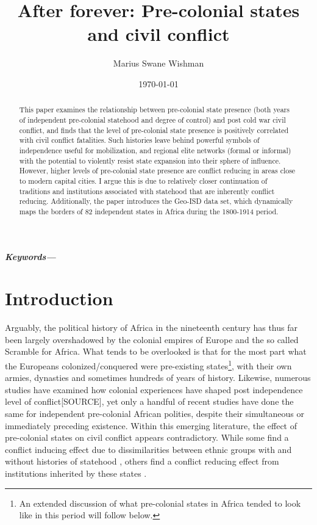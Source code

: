 \documentclass[12pt]{article}
\title{After forever: Pre-colonial states and civil conflict}
\author[1]{Marius Swane Wishman}
\affil[1]{Department of Sociology and Political Science, NTNU}
\date{\today}
\providecommand{\keywords}[1]
{
	\small	
	\textbf{\textit{Keywords---}} #1
}
\begin{document}
\maketitle

\begin{abstract}

This paper examines the relationship between pre-colonial state presence (both
years of independent pre-colonial statehood and degree of control) and post cold
war civil conflict, and finds that the level of pre-colonial state presence is
positively correlated with civil conflict fatalities. Such histories leave
behind powerful symbols of independence useful for mobilization, and regional
elite networks (formal or informal) with the potential to violently resist state
expansion into their sphere of influence. However, higher levels of pre-colonial
state presence are conflict reducing in areas close to modern capital cities. I
argue this is due to relatively closer continuation of traditions and
institutions associated with statehood that are inherently conflict reducing.
Additionally, the paper introduces the Geo-ISD data set, which dynamically maps
the borders of 82 independent states in Africa during the 1800-1914 period. 

\end{abstract}

\keywords{}


\onehalfspacing


\newpage

\section{Introduction}

Arguably, the political history of Africa in the nineteenth century has thus far
been largely overshadowed by the colonial empires of Europe and the so called
Scramble for Africa. What tends to be overlooked is that for the most part what
the Europeans colonized/conquered were pre-existing states\footnote{An extended
discussion of what pre-colonial states in Africa tended to look like in this
period will follow below.}, with their own armies, dynasties and sometimes
hundreds of years of history. Likewise, numerous studies have examined how
colonial experiences have shaped post independence level of conflict[SOURCE],
yet only a handful of recent studies have done the same for independent
pre-colonial African polities, despite their simultaneous or immediately
preceding existence. Within this emerging literature, the effect of pre-colonial
states on civil conflict appears contradictory. While some find a conflict
inducing effect due to dissimilarities between ethnic groups with and without
histories of statehood \citep{Englebert2002, Paine2019}, others find a conflict
reducing effect from institutions inherited by these states
\citep{Depetris-Chauvin2016, Wig2016}.
\end{document}
